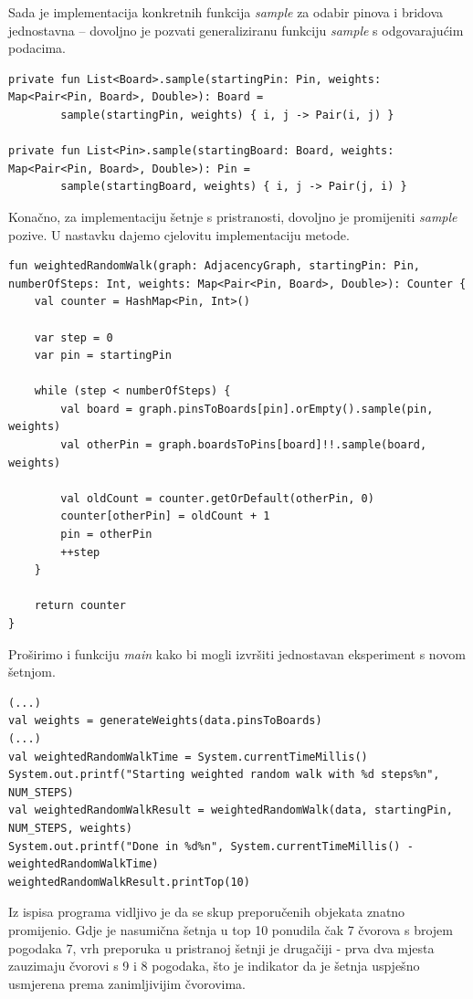 \documentclass[times, utf8, seminar]{fer}
\begin{document}
Sada je implementacija konkretnih funkcija \textit{sample} za odabir pinova i bridova jednostavna -- dovoljno je pozvati generaliziranu funkciju \textit{sample} s odgovarajućim podacima.

\begin{lstlisting}
private fun List<Board>.sample(startingPin: Pin, weights: Map<Pair<Pin, Board>, Double>): Board =
        sample(startingPin, weights) { i, j -> Pair(i, j) }

private fun List<Pin>.sample(startingBoard: Board, weights: Map<Pair<Pin, Board>, Double>): Pin =
        sample(startingBoard, weights) { i, j -> Pair(j, i) }
\end{lstlisting}

Konačno, za implementaciju šetnje s pristranosti, dovoljno je promijeniti \textit{sample} pozive. U nastavku dajemo cjelovitu implementaciju metode.

\begin{lstlisting}
fun weightedRandomWalk(graph: AdjacencyGraph, startingPin: Pin, numberOfSteps: Int, weights: Map<Pair<Pin, Board>, Double>): Counter {
    val counter = HashMap<Pin, Int>()

    var step = 0
    var pin = startingPin

    while (step < numberOfSteps) {
        val board = graph.pinsToBoards[pin].orEmpty().sample(pin, weights)
        val otherPin = graph.boardsToPins[board]!!.sample(board, weights)

        val oldCount = counter.getOrDefault(otherPin, 0)
        counter[otherPin] = oldCount + 1
        pin = otherPin
        ++step
    }

    return counter
}
\end{lstlisting}

Proširimo i funkciju \textit{main} kako bi mogli izvršiti jednostavan eksperiment s novom šetnjom.

\begin{lstlisting}
(...)
val weights = generateWeights(data.pinsToBoards)
(...)
val weightedRandomWalkTime = System.currentTimeMillis()
System.out.printf("Starting weighted random walk with %d steps%n", NUM_STEPS)
val weightedRandomWalkResult = weightedRandomWalk(data, startingPin, NUM_STEPS, weights)
System.out.printf("Done in %d%n", System.currentTimeMillis() - weightedRandomWalkTime)
weightedRandomWalkResult.printTop(10)
\end{lstlisting}

Iz ispisa programa vidljivo je da se skup preporučenih objekata znatno promijenio. Gdje je nasumična šetnja u top 10 ponudila čak 7 čvorova s brojem pogodaka 7, vrh preporuka u pristranoj šetnji je drugačiji - prva dva mjesta zauzimaju čvorovi s 9 i 8 pogodaka, što je indikator da je šetnja uspješno usmjerena prema zanimljivijim čvorovima.
\end{document}

